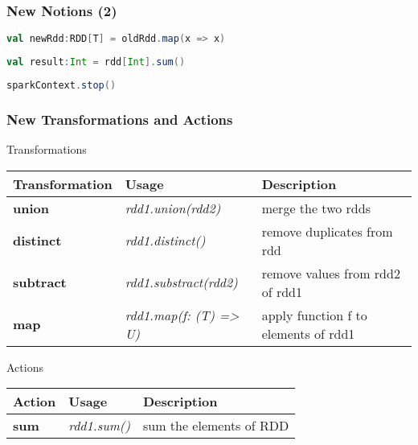 \documentclass[slidetop,9pt,utf8]{beamer}
\begin{document}
\begin{CJK}{UTF8}{gbsn}
\begin{frame}[fragile]
  \frametitle{New Notions (2)}

  \begin{lstlisting}[label=RDDTransformation, caption=Apply transformation to RDD, language=scala, style=code]
val newRdd:RDD[T] = oldRdd.map(x => x)
  \end{lstlisting}

  \begin{lstlisting}[label=RDDAction, caption=Apply action to RDD, language=scala, style=code]
val result:Int = rdd[Int].sum()
  \end{lstlisting}

  \begin{lstlisting}[label=StopSparkContext, caption=Stop Spark Context, language=scala, style=code]
sparkContext.stop()
  \end{lstlisting}

\end{frame}

\begin{frame}

  \frametitle{New Transformations and Actions}

  \begin{block}{Transformations}
    \begin{center}
      \begin{tabular}{|m{2.1cm}|m{3.5cm}|m{5cm}|}
        \hline 
        \rowcolor{gray} \textbf{Transformation} & \textbf{Usage} & \textbf{Description} \\ \hline
        \textbf{union} & \textit{rdd1.union(rdd2)} & merge the two rdds \\ \hline
        \textbf{distinct} & \textit{rdd1.distinct()} & remove duplicates from rdd \\ \hline
        \textbf{subtract} & \textit{rdd1.substract(rdd2)} & remove values from rdd2 of rdd1 \\ \hline
        \textbf{map} & \textit{rdd1.map(f: (T) =\textgreater\xspace U)} & apply function f to elements of rdd1 \\ \hline
      \end{tabular}
    \end{center}
  \end{block}

  \begin{block}{Actions}
    \begin{center}
      \begin{tabular}{|m{2.1cm}|m{3.5cm}|m{5cm}|}
        \hline 
        \rowcolor{gray} \textbf{Action} & \textbf{Usage} & \textbf{Description} \\ \hline
        \textbf{sum} & \textit{rdd1.sum()} & sum the elements of RDD \\ \hline
      \end{tabular}
    \end{center}
  \end{block}


\end{frame}
\end{CJK}
\end{document}
